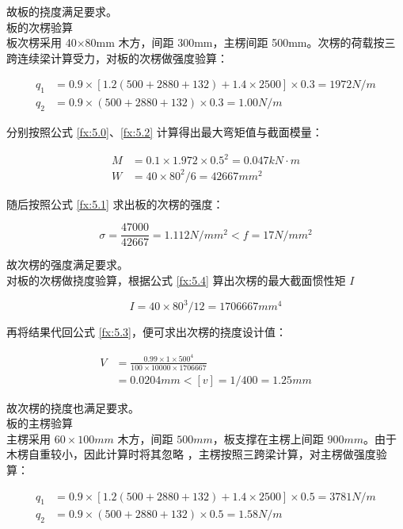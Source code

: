 故板的挠度满足要求。\\

 板的次楞验算\\

板次楞采用 40×80mm 木方，间距 300mm，主楞间距 500mm。次楞的荷载按三跨连续梁计算受力，对板的次楞做强度验算：

\begin{align*}
    q_1&=0.9\times [1.2(500+2880+132)+1.4\times 2500]\times 0.3=1972 N/m \\
    q_2&=0.9\times (500+2880+132)\times 0.3=1.00 N/m
\end{align*}

分别按照公式 \ref{fx:5.0}、\ref{fx:5.2} 计算得出最大弯矩值与截面模量：

\begin{align*}
    M&=0.1\times 1.972\times 0.5^2=0.047 kN \cdot m\\
    W&=40\times 80^2 /6=42667 mm^2
\end{align*}

随后按照公式 \ref{fx:5.1} 求出板的次楞的强度：

\[
    \sigma = \frac{47000}{42667}=1.112 N/mm^2< f=17N/mm^2
\]

故次楞的强度满足要求。\\

对板的次楞做挠度验算，根据公式 \ref{fx:5.4} 算出次楞的最大截面惯性矩 $I$

\[
    I=40\times 80^3 /12=1706667 mm^4
\]

再将结果代回公式 \ref{fx:5.3}，便可求出次楞的挠度设计值：

\begin{align*}
    V&=\frac{0.99\times 1 \times 500^4}{100\times 10000\times 1706667}\\
    &=0.0204 mm<[v]=1/400=1.25mm
\end{align*}

故次楞的挠度也满足要求。\\

 板的主楞验算\\

主楞采用 $60\times 100mm$ 木方，间距 $500mm$，板支撑在主楞上间距 $900mm$。由于木楞自重较小，因此计算时将其忽略
，主楞按照三跨梁计算，对主楞做强度验算：

\begin{align*}
    q_1&=0.9\times [1.2(500+2880+132)+1.4\times 2500]\times 0.5=3781 N/m \\
    q_2&=0.9\times (500+2880+132)\times 0.5=1.58 N/m
\end{align*}


